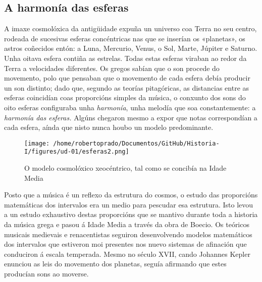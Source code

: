 \hypertarget{a-harmonuxeda-das-esferas}{%
\subsection*{A harmonía das esferas}\label{a-harmonuxeda-das-esferas}}

A imaxe cosmolóxica da antigüidade expuña un universo coa Terra no seu
centro, rodeada de sucesivas esferas concéntricas nas que se inserían os
«planetas», os astros coñecidos entón: a Luna, Mercurio, Venus, o Sol,
Marte, Júpiter e Saturno. Unha oitava esfera contiña as estrelas. Todas
estas esferas viraban ao redor da Terra a velocidades diferentes. Os
gregos sabían que o son procede do movemento, polo que pensaban que o
movemento de cada esfera debía producir un son distinto; dado que,
segundo as teorías pitagóricas, as distancias entre as esferas
coincidían coas proporcións simples da música, o conxunto dos sons do
oito esferas configuraba unha \emph{harmonía}, unha melodía que soa
constantemente: a \emph{harmonía das esferas.} Algúns chegaron mesmo a
expor que notas correspondían a cada esfera, aínda que nisto nunca houbo
un modelo predominante.

\begin{figure}[htp]
\centering
\texttt{[image: /home/robertoprado/Documentos/GitHub/Historia-I/figures/ud-01/esferas2.png]}
\caption{O modelo cosmolóxico xeocéntrico, tal como se concibía na Idade Media}
\end{figure}


Posto que a música é un reflexo da estrutura do cosmos, o estudo das
proporcións matemáticas dos intervalos era un medio para pescudar esa
estrutura. Isto levou a un estudo exhaustivo destas proporcións que se
mantivo durante toda a historia da música grega e pasou á Idade Media a
través da obra de Boecio. Os teóricos musicais medievais e renacentistas
seguiron desenvolvendo modelos matemáticos dos intervalos que estiveron
moi presentes nos nuevo sistemas de afinación que conduciron á escala
temperada. Mesmo no século XVII, cando Johannes Kepler enunciou as leis
do movemento dos planetas, seguía afirmando que estes producían sons ao
moverse.

